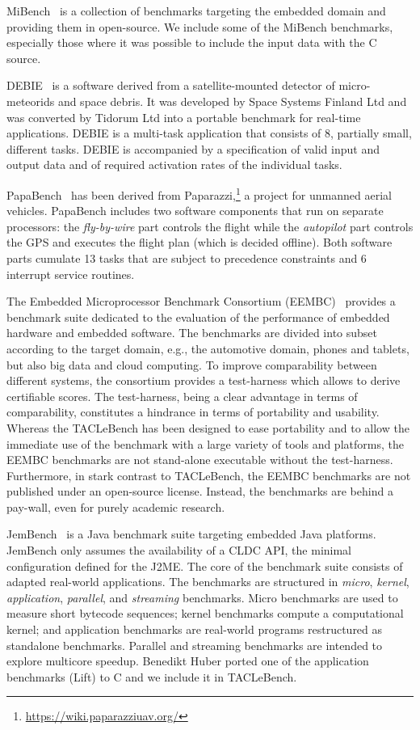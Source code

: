 \documentclass[a4paper,UKenglish]{oasics}
\newcommand{\martin}[1]{{\color{blue} Martin: #1}}
\begin{document}
MiBench~\cite{MiBench} is a collection of benchmarks targeting the embedded
domain and providing them in open-source.
We include some of the MiBench benchmarks, especially
those where it was possible to include the input data with the C source.

DEBIE~\cite{debie} is a software derived from a satellite-mounted detector of micro-meteorids and space debris.
It was developed by Space Systems Finland Ltd and was converted by Tidorum Ltd into a portable benchmark for real-time applications.
DEBIE is a multi-task application that consists of 8, partially small, different tasks.
DEBIE is accompanied by a specification of valid input and output data and of required activation rates of the individual tasks.

PapaBench~\cite{papabench} has been derived from  Paparazzi,\footnote{\url{https://wiki.paparazziuav.org/}}
a project for unmanned aerial vehicles.  PapaBench includes
two software components that run on separate processors:
the \textit{fly-by-wire} part controls the flight while the \textit{autopilot} part controls the GPS and
executes the flight plan (which is decided offline). Both software parts  cumulate 13 tasks that are subject
to precedence constraints and 6 interrupt service routines.

The Embedded Microprocessor Benchmark Consortium (EEMBC)~\cite{eembc} provides a
benchmark suite dedicated to the evaluation of
the performance of embedded hardware and embedded software.
The benchmarks are divided into subset according to the target domain, e.g., the automotive domain, phones and tablets, but also big data and cloud computing.
To improve comparability between different systems, the consortium provides a
test-harness which allows to derive certifiable scores.
The test-harness, being a clear advantage in terms of comparability,
constitutes a hindrance in terms of portability and usability.
Whereas the TACLeBench has been designed to ease portability and to allow the immediate use of the benchmark with a large variety of tools and platforms, the EEMBC benchmarks are not stand-alone executable without the test-harness.
Furthermore, in stark contrast to TACLeBench, the EEMBC benchmarks are not published under an open-source license.
Instead, the benchmarks are behind a pay-wall, even for purely academic research.


JemBench~\cite{jembench} is a Java benchmark suite targeting
embedded Java platforms. JemBench only assumes the
availability of a CLDC API, the minimal configuration
defined for the J2ME. The core of the benchmark suite consists of
adapted real-world applications.
The benchmarks are structured in {\em micro}, {\em kernel}, {\em
application}, {\em parallel}, and {\em streaming} benchmarks.
Micro benchmarks are used to measure short bytecode sequences;
kernel benchmarks compute a computational kernel; and application
benchmarks are real-world programs restructured as standalone benchmarks.
Parallel and streaming benchmarks are intended to explore multicore
speedup.
Benedikt Huber ported one of the application benchmarks (Lift) to C
and we include it in TACLeBench.
\end{document}
